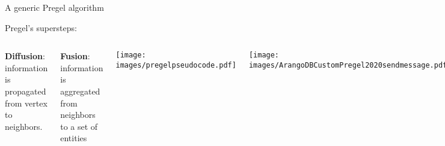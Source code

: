 \documentclass[aspectratio = 169, 15pt, handout]{beamer}
\begin{document}
    \begin{frame}{A generic Pregel algorithm}
        
        \hspace*{-0.7cm}
        {\color{darkgray}Pregel's supersteps:}
        \begin{columns}[t]
                \vspace*{-0.3cm}
                
                \hspace*{-0.1cm}
                {%
                    \color{darkgray}%
                    \small\textbf{Diffusion}: information is propagated from vertex to neighbors.
                }
                
                \hspace*{-0.1cm}
                {%
                    \color{darkgray}%
                    \small\textbf{Fusion}: information is aggregated from neighbors to a set of entities
                }
                
                \vspace*{-1cm}
                \hspace*{-2cm}
                \begin{center}
                    \texttt{[image: images/pregelpseudocode.pdf]}
                \end{center}
                
                \vspace*{-0.1cm}
                \begin{center}
                    \hspace*{-4.7cm}
                    \texttt{[image: images/ArangoDBCustomPregel2020sendmessage.pdf]}
                \end{center}
        \end{columns}
\end{frame}
\end{document}
